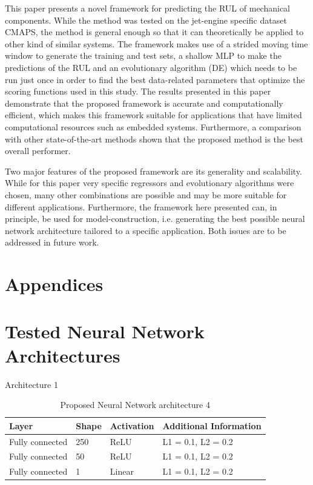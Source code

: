 \documentclass[12pt]{IEEEtran}%
\begin{document}
This paper presents a novel framework for predicting the RUL of mechanical components. While the method was tested on the jet-engine specific dataset CMAPS, the method is general enough so that it can theoretically be applied to other kind of similar systems. The framework makes use of a strided moving time window to generate the training and test sets, a shallow MLP to make the predictions of the RUL and an evolutionary algorithm (DE) which needs to be run just once in order to find the best data-related parameters that optimize the scoring functions used in this study.  The results presented in this paper demonstrate that the proposed framework is accurate and computationally efficient, which makes this framework suitable for applications that have limited computational resources such as embedded systems. Furthermore, a comparison with other state-of-the-art methods shown that the proposed method is the best overall performer. 

Two major features of the proposed framework are its generality and scalability. While for this paper very specific regressors and evolutionary algorithms were chosen, many other combinations are possible and may be more suitable for different applications. Furthermore, the framework here presented can, in principle, be used for model-construction, i.e. generating the best possible neural network architecture tailored to a specific application. Both issues are to be addressed in future work.


\pagebreak
\appendix
{}
\section*{Appendices}

\section{Tested Neural Network Architectures}
\label{sec:appendices}

Architecture 1

\begin{table}[!htb]
\centering
\begin{tabular}{l l l l}
	\hline
	Layer & Shape & Activation & Additional Information\\
  	\hline
  	Fully connected & 250 & ReLU & L1 = 0.1, L2 = 0.2\\
  	Fully connected & 50 & ReLU & L1 = 0.1, L2 = 0.2\\
  	Fully connected & 1 & Linear & L1 = 0.1, L2 = 0.2\\
  	\hline
\end{tabular}
\caption{Proposed Neural Network architecture 4}
\label{table:proposed_nn_4}
\end{table}
\end{document}

